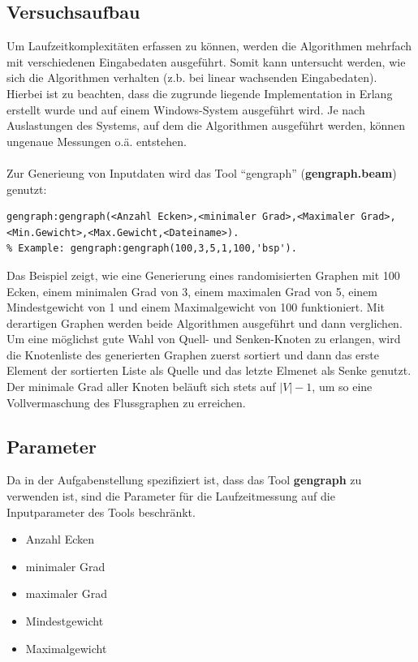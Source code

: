 \documentclass[11pt]{article}
\begin{document}
    \subsection{Versuchsaufbau}
    Um Laufzeitkomplexit\"aten erfassen zu k\"onnen, werden die Algorithmen mehrfach mit verschiedenen Eingabedaten ausgef\"uhrt. Somit kann untersucht werden, wie sich die Algorithmen verhalten (z.b. bei linear wachsenden Eingabedaten). Hierbei ist zu beachten, dass die zugrunde liegende Implementation in Erlang erstellt wurde und auf einem Windows-System ausgef\"uhrt wird. Je nach Auslastungen des Systems, auf dem die Algorithmen ausgef\"uhrt werden, k\"onnen ungenaue Messungen o.\"a. entstehen.\\~\\
    Zur Generieung von Inputdaten wird das Tool "`gengraph"' (\textbf{gengraph.beam}) genutzt:
\begin{lstlisting}
gengraph:gengraph(<Anzahl Ecken>,<minimaler Grad>,<Maximaler Grad>,<Min.Gewicht>,<Max.Gewicht,<Dateiname>).
% Example: gengraph:gengraph(100,3,5,1,100,'bsp').
\end{lstlisting}
    Das Beispiel zeigt, wie eine Generierung eines randomisierten Graphen mit 100 Ecken, einem minimalen Grad von 3, einem maximalen Grad von 5, einem Mindestgewicht von 1 und einem Maximalgewicht von 100 funktioniert. Mit derartigen Graphen werden beide Algorithmen ausgef\"uhrt und dann verglichen. Um eine m\"oglichst gute Wahl von Quell- und Senken-Knoten zu erlangen, wird die Knotenliste des generierten Graphen zuerst sortiert und dann das erste Element der sortierten Liste als Quelle und das letzte Elmenet als Senke genutzt. Der minimale Grad aller Knoten bel\"auft sich stets auf $|V|-1$, um so eine Vollvermaschung des Flussgraphen zu erreichen.

    \subsection{Parameter}
    Da in der Aufgabenstellung spezifiziert ist, dass das Tool \textbf{gengraph} zu verwenden ist, sind die Parameter f\"ur die Laufzeitmessung auf die Inputparameter des Tools beschr\"ankt.
    \begin{itemize}
        \item Anzahl Ecken
        \item minimaler Grad
        \item maximaler Grad
        \item Mindestgewicht
        \item Maximalgewicht
    \end{itemize}
\end{document}
